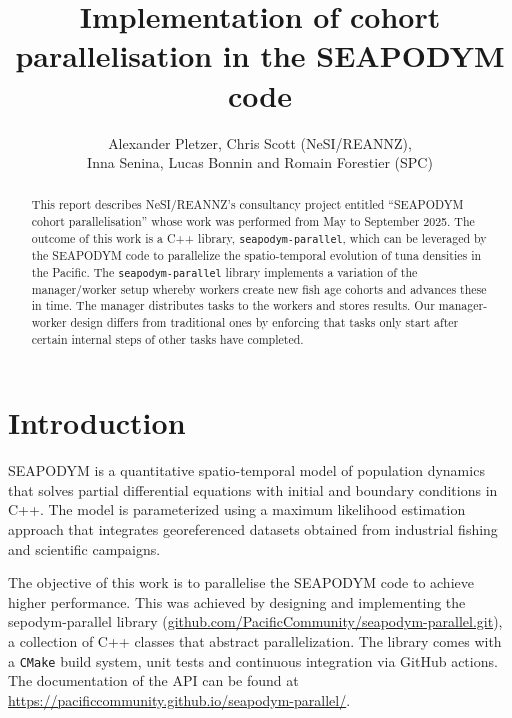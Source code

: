 \documentclass[a4paper,oneside,12pt]{article}
\begin{document}
\author{Alexander Pletzer, Chris Scott (NeSI/REANNZ), \\
Inna Senina, Lucas Bonnin and Romain Forestier (SPC)}
\title{Implementation of cohort parallelisation in the SEAPODYM code}

\maketitle

\begin{abstract}
This report describes NeSI/REANNZ's consultancy project entitled ``SEAPODYM cohort parallelisation'' 
whose work was performed from May to September 2025. The outcome of this work is a C++ library,
\verb|seapodym-parallel|, which can be leveraged by the SEAPODYM code to parallelize the spatio-temporal
evolution of tuna densities in the Pacific. The \verb|seapodym-parallel| library implements a 
variation of the manager/worker setup whereby workers create new fish age cohorts and advances these in time. 
The manager distributes tasks to the workers and stores results. 
Our manager-worker design differs from traditional ones by enforcing that tasks only start after certain 
internal steps of other tasks have completed.
\end{abstract}


\pagestyle{plain}


\section{Introduction}

SEAPODYM is a quantitative spatio-temporal model
of population dynamics that solves partial differential
equations with initial and boundary conditions in C++. 
The model is parameterized using a maximum
likelihood estimation approach that integrates georeferenced 
datasets obtained from industrial fishing and scientific campaigns.

The objective of this work is to parallelise the SEAPODYM code to achieve higher performance. 
This was achieved by designing and implementing the sepodym-parallel library 
(\url{github.com/PacificCommunity/seapodym-parallel.git}), a collection of 
C++ classes that abstract parallelization. The library comes with a 
\verb|CMake| build system, unit tests and continuous integration via 
GitHub actions. The documentation of the API can be found at 
\url{https://pacificcommunity.github.io/seapodym-parallel/}.
\end{document}
